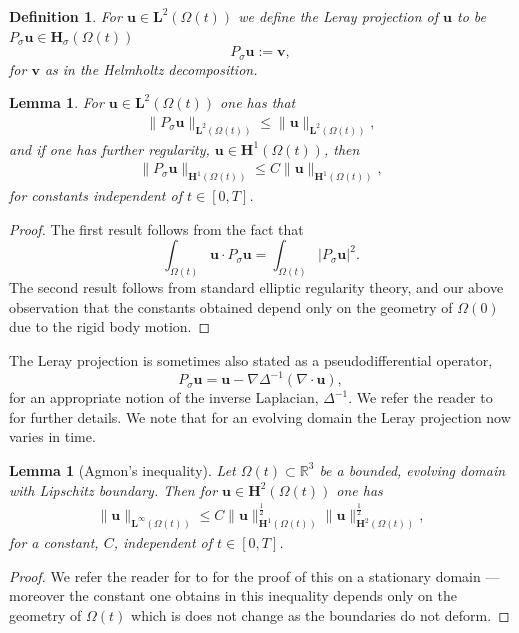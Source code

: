 \documentclass[a4paper]{amsart}
\numberwithin{equation}{section}
\newcommand{\grad}{\nabla}
\newcommand{\Div}{\nabla \cdot}
\theoremstyle{plain}
\newtheorem{lemma}[theorem]{Lemma}
\newtheorem{definition}[theorem]{Definition}
\newcommand{\mbf}[1]{\mathbf{#1}}
\newcommand{\mbb}[1]{\mathbb{#1}}
\begin{document}
\begin{definition}
	For $\mbf{u} \in \mbf{L}^2(\Omega(t))$ we define the Leray projection of $\mbf{u}$ to be $P_\sigma \mbf{u} \in \mbf{H}_\sigma(\Omega(t))$
	\[ P_\sigma \mbf{u} := \mbf{v}, \]
	for $\mbf{v}$ as in the Helmholtz decomposition.
\end{definition}
\begin{lemma}  
    For $\mbf{u} \in \mbf{L}^2(\Omega(t))$ one has that
    \begin{align}
        \|P_\sigma \mbf{u}\|_{\mbf{L}^2(\Omega(t))} \leq \|\mbf{u}\|_{\mbf{L}^2(\Omega(t))}, \label{eqn: leray L2 bound}
    \end{align}
    and if one has further regularity, $\mbf{u} \in \mbf{H}^1(\Omega(t))$, then
    \begin{align}
        \|P_\sigma \mbf{u}\|_{\mbf{H}^1(\Omega(t))} \leq C\|\mbf{u}\|_{\mbf{H}^1(\Omega(t))}, \label{eqn: leray H1 bound}
    \end{align}
    for constants independent of $t \in [0,T]$.
\end{lemma}
\begin{proof}
    The first result follows from the fact that
    \[ \int_{\Omega(t)} \mbf{u} \cdot P_\sigma \mbf{u} = \int_{\Omega(t)} |P_\sigma \mbf{u}|^2. \]
    The second result follows from standard elliptic regularity theory, and our above observation that the constants obtained depend only on the geometry of $\Omega(0)$ due to the rigid body motion.
\end{proof}
The Leray projection is sometimes also stated as a pseudodifferential operator,
\[ P_\sigma \mbf{u} = \mbf{u} - \grad \Delta^{-1}(\Div \mbf{u}), \]
for an appropriate notion of the inverse Laplacian, $\Delta^{-1}$.
We refer the reader to \cite{robinson2016three,temam2001navier} for further details.
We note that for an evolving domain the Leray projection now varies in time.
\begin{lemma}[Agmon's inequality]
	Let $\Omega(t) \subset \mbb{R}^3$ be a bounded, evolving domain with Lipschitz boundary.
	Then for $\mbf{u} \in \mbf{H}^2(\Omega(t))$ one has
	\begin{align}
		\|\mbf{u}\|_{\mbf{L}^\infty(\Omega(t))} \leq C \|\mbf{u}\|_{\mbf{H}^1(\Omega(t))}^{\frac{1}{2}}\|\mbf{u}\|_{\mbf{H}^2(\Omega(t))}^{\frac{1}{2}},\label{agmon inequality}
	\end{align}
	for a constant, $C$, independent of $t \in [0,T]$.
\end{lemma}

\begin{proof}
	We refer the reader for to \cite{agmon2010lectures} for the proof of this on a stationary domain --- moreover the constant one obtains in this inequality depends only on the geometry of $\Omega(t)$ which is does not change as the boundaries do not deform.
\end{proof}
\end{document}
